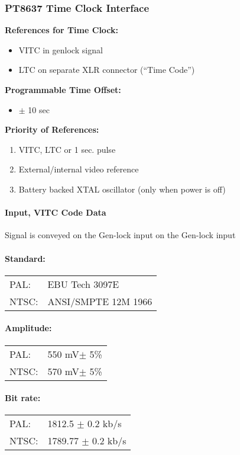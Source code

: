 \subsubsection{PT8637 Time Clock Interface}
\textbf{References for Time Clock:}
\begin{itemize}
\item VITC in genlock signal
\item LTC on separate XLR connector (``Time Code'')
\end{itemize}

\textbf{Programmable Time Offset:}
\begin{itemize}
\item $\pm$ 10 sec
\end{itemize}

\textbf{Priority of References:}
\begin{enumerate}
\item VITC, LTC or 1 sec. pulse
\item External/internal video reference
\item Battery backed XTAL oscillator (only when power is off)
\end{enumerate}

\paragraph{Input, VITC Code Data}
Signal is conveyed on the Gen-lock input on the Gen-lock input

\paragraph{Standard:}
\begin{tabular}{l l}
PAL:		& EBU Tech 3097E \\
NTSC:		& ANSI/SMPTE 12M 1966 \\
\end{tabular}

\paragraph{Amplitude:}
\begin{tabular}{l l}
PAL:	& 550 mV$\pm$ 5\% \\
NTSC: & 570 mV$\pm$ 5\% \\
\end{tabular}

\paragraph{Bit rate:}
\begin{tabular}{l l}
PAL:		& 1812.5 $\pm$ 0.2 kb/s \\
NTSC:		& 1789.77 $\pm$ 0.2 kb/s \\
\end{tabular}

